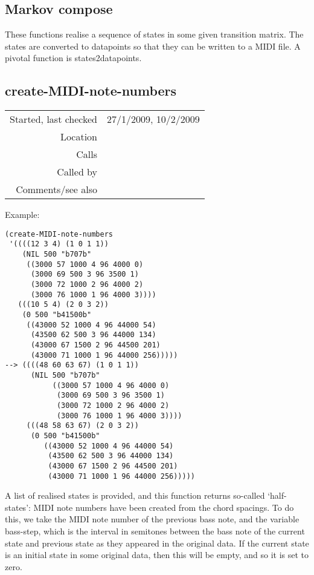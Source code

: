 \subsection{Markov compose}\label{sec:markov-compose}

These functions realise a sequence of states in some
given transition matrix. The states are converted to
datapoints so that they can be written to a MIDI file.
A pivotal function is states2datapoints.


\subsection*{create-MIDI-note-numbers}\label{fun:create-MIDI-note-numbers}

\vspace{0.3cm}
\begin{tabular}{r|p{8cm}}
Started, last checked & 27/1/2009, 10/2/2009 \\
Location & \nameref{sec:markov-compose} \\
Calls & \nameref{fun:spacing2note-numbers} \\
Called by & \nameref{fun:states2datapoints} \\
Comments/see also & \nameref{fun:create-MIDI-and-morphetic-numbers}
\end{tabular}

\vspace{0.5cm}
\noindent Example:
\begin{verbatim}
(create-MIDI-note-numbers
 '((((12 3 4) (1 0 1 1))
    (NIL 500 "b707b"
     ((3000 57 1000 4 96 4000 0)
      (3000 69 500 3 96 3500 1)
      (3000 72 1000 2 96 4000 2)
      (3000 76 1000 1 96 4000 3))))
   (((10 5 4) (2 0 3 2))
    (0 500 "b41500b"
     ((43000 52 1000 4 96 44000 54)
      (43500 62 500 3 96 44000 134)
      (43000 67 1500 2 96 44500 201)
      (43000 71 1000 1 96 44000 256)))))
--> ((((48 60 63 67) (1 0 1 1))
      (NIL 500 "b707b"
           ((3000 57 1000 4 96 4000 0)
            (3000 69 500 3 96 3500 1)
            (3000 72 1000 2 96 4000 2)
            (3000 76 1000 1 96 4000 3))))
     (((48 58 63 67) (2 0 3 2))
      (0 500 "b41500b"
         ((43000 52 1000 4 96 44000 54)
          (43500 62 500 3 96 44000 134)
          (43000 67 1500 2 96 44500 201)
          (43000 71 1000 1 96 44000 256)))))
\end{verbatim}

\noindent A list of realised states is provided, and
this function returns so-called `half-states': MIDI
note numbers have been created from the chord
spacings. To do this, we take the MIDI note number of
the previous bass note, and the variable bass-step,
which is the interval in semitones between the bass
note of the current state and previous state as they
appeared in the original data. If the current state is
an initial state in some original data, then this will
be empty, and so it is set to zero.


